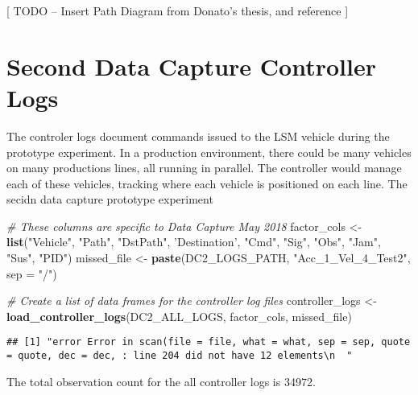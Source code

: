 \documentclass[]{article}
\newenvironment{Shaded}{\begin{snugshade}}{\end{snugshade}}
\newcommand{\CommentTok}[1]{\textcolor[rgb]{0.56,0.35,0.01}{\textit{#1}}}
\newcommand{\DataTypeTok}[1]{\textcolor[rgb]{0.13,0.29,0.53}{#1}}
\newcommand{\KeywordTok}[1]{\textcolor[rgb]{0.13,0.29,0.53}{\textbf{#1}}}
\newcommand{\NormalTok}[1]{#1}
\newcommand{\StringTok}[1]{\textcolor[rgb]{0.31,0.60,0.02}{#1}}
\begin{document}
{[} TODO -- Insert Path Diagram from Donato's thesis, and reference {]}

\newpage

\hypertarget{second-data-capture-controller-logs}{%
\section{Second Data Capture Controller
Logs}\label{second-data-capture-controller-logs}}

The controler logs document commands issued to the LSM vehicle during
the prototype experiment. In a production environment, there could be
many vehicles on many productions lines, all running in parallel. The
controller would manage each of these vehicles, tracking where each
vehicle is positioned on each line. The secidn data capture prototype
experiment

\begin{Shaded}
\begin{Highlighting}[]
\CommentTok{# These columns are specific to Data Capture May 2018}
\NormalTok{factor_cols <-}\StringTok{ }\KeywordTok{list}\NormalTok{(}\StringTok{"Vehicle"}\NormalTok{, }\StringTok{"Path"}\NormalTok{, }\StringTok{"DstPath"}\NormalTok{, }\StringTok{'Destination'}\NormalTok{, }
                    \StringTok{"Cmd"}\NormalTok{, }\StringTok{"Sig"}\NormalTok{, }\StringTok{"Obs"}\NormalTok{, }\StringTok{"Jam"}\NormalTok{, }\StringTok{"Sus"}\NormalTok{, }\StringTok{"PID"}\NormalTok{)}
\NormalTok{missed_file <-}\StringTok{ }\KeywordTok{paste}\NormalTok{(DC2_LOGS_PATH, }\StringTok{"Acc_1_Vel_4_Test2"}\NormalTok{, }\DataTypeTok{sep =} \StringTok{"/"}\NormalTok{)}
\end{Highlighting}
\end{Shaded}

\begin{Shaded}
\begin{Highlighting}[]
\CommentTok{# Create a list of data frames for the controller log files }
\NormalTok{controller_logs <-}\StringTok{ }\KeywordTok{load_controller_logs}\NormalTok{(DC2_ALL_LOGS, factor_cols, missed_file)}
\end{Highlighting}
\end{Shaded}

\begin{verbatim}
## [1] "error Error in scan(file = file, what = what, sep = sep, quote = quote, dec = dec, : line 204 did not have 12 elements\n  "
\end{verbatim}

The total observation count for the all controller logs is 34972.
\end{document}
